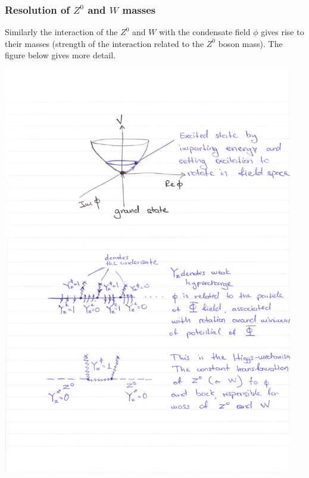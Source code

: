 \subsubsection{Resolution of $Z^0$ and $W$ masses}
Similarly the interaction of the $Z^0$ and $W$ with the condensate field $\phi$ gives rise to their masses (strength of the interaction related to the $Z^0$ boson mass). The figure below gives more detail.
\begin{center}
\includegraphics[width=0.95\textwidth]{fig/higgs/boson_mass.pdf}
\end{center}

